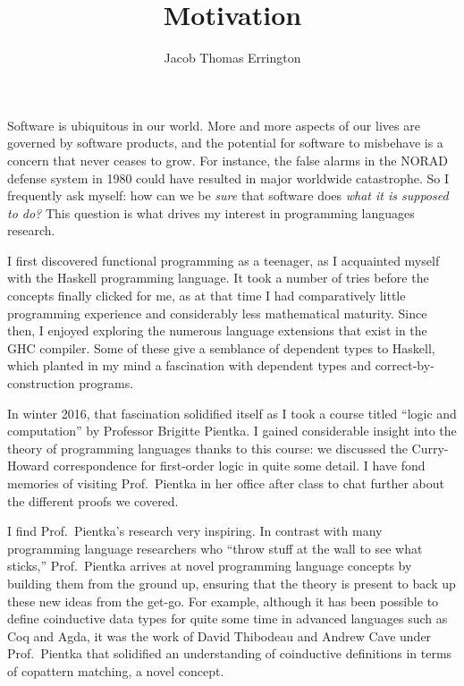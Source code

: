 \documentclass[11pt,letterpaper]{article}
\author{Jacob Thomas Errington}
\title{Motivation}
\date{}
\begin{document}
\maketitle

Software is ubiquitous in our world. More and more aspects of our lives are
governed by software products, and the potential for software to misbehave is a
concern that never ceases to grow.
For instance, the false alarms in the NORAD defense system in 1980 could have
resulted in major worldwide catastrophe.
So I frequently ask myself: how can we be \emph{sure} that software does
\emph{what it is supposed to do?}
This question is what drives my interest in programming languages research.

I first discovered functional programming as a teenager, as I acquainted myself
with the Haskell programming language.
It took a number of tries before the concepts finally clicked for me, as at
that time I had comparatively little programming experience and considerably
less mathematical maturity.
Since then, I enjoyed exploring the numerous language extensions that exist in
the GHC compiler.
Some of these give a semblance of dependent types to Haskell, which planted in
my mind a fascination with dependent types and correct-by-construction
programs.

In winter 2016, that fascination solidified itself as I took a course titled
``logic and computation'' by Professor Brigitte Pientka.
I gained considerable insight into the theory of programming languages thanks
to this course: we discussed the Curry-Howard correspondence for first-order
logic in quite some detail.
I have fond memories of visiting Prof.~Pientka in her office after class to
chat further about the different proofs we covered.
%

I find Prof.~Pientka's research very inspiring. In contrast with many
programming language researchers who ``throw stuff at the wall to see what
sticks,'' Prof.~Pientka arrives at novel programming language concepts by
building them from the ground up, ensuring that the theory is present to back
up these new ideas from the get-go.
For example, although it has been possible to define coinductive data types for
quite some time in advanced languages such as Coq and Agda, it was the work of
David Thibodeau and Andrew Cave under Prof.~Pientka that solidified an
understanding of coinductive definitions in terms of copattern matching, a
novel concept\footnotemark.
%
%
\end{document}
